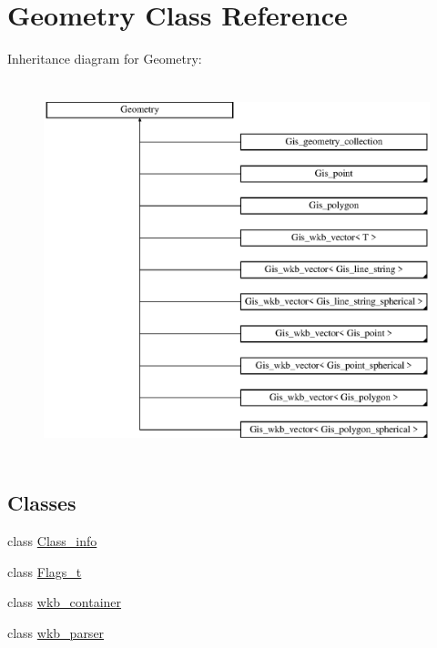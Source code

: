 \hypertarget{classGeometry}{}\section{Geometry Class Reference}
\label{classGeometry}
Inheritance diagram for Geometry\+:\begin{figure}[H]
\begin{center}
\leavevmode
\includegraphics[height=11.000000cm]{classGeometry}
\end{center}
\end{figure}
\subsection*{Classes}
\begin{DoxyCompactItemize}
\item 
class \mbox{\hyperlink{classGeometry_1_1Class__info}{Class\+\_\+info}}
\item 
class \mbox{\hyperlink{classGeometry_1_1Flags__t}{Flags\+\_\+t}}
\item 
class \mbox{\hyperlink{classGeometry_1_1wkb__container}{wkb\+\_\+container}}
\item 
class \mbox{\hyperlink{classGeometry_1_1wkb__parser}{wkb\+\_\+parser}}
\end{DoxyCompactItemize}
